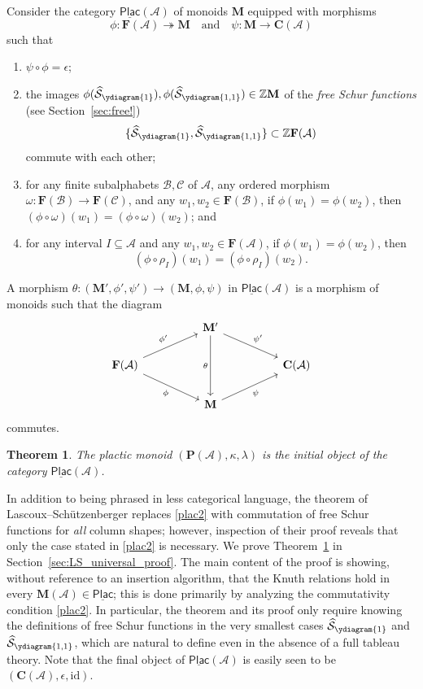 \documentclass[12 pt]{amsart}
\newcommand{\Z}{\mathbb{Z}}
\newcommand{\Plactic}{{\mathbf{P}}}
\newcommand{\Free}{\mathbf{F}}
\newcommand{\Monoid}{\mathbf{M}}
\newcommand{\Abelian}{\mathbf{C}}
\newcommand{\LSCategory}{\underline{\mathsf{Plac}}}
\newcommand{\FreeSchur}{\widehat{\mathcal{S}}}
\newcommand{\cA}{\mathcal{A}}
\newcommand{\cB}{\mathcal{B}}
\newcommand{\cC}{\mathcal{C}}
\newcommand{\id}{\mathrm{id}}
\newtheorem{theorem}[thm]{Theorem}
\theoremstyle{remark}
\numberwithin{equation}{section}
\begin{document}
Consider the category $\LSCategory(\cA)$ of monoids $\Monoid$ equipped with morphisms
\[\phi : \Free(\cA) \twoheadrightarrow \Monoid \quad \text{and} \quad \psi : \Monoid \to \Abelian(\cA)
\]such that 
\begin{enumerate}[label=\textrm{(Plac.\arabic*)}]
    \item $\psi \circ \phi = \epsilon$; \label{plac1}
    \item {} the images $\phi(\FreeSchur_{\ydiagram{1}}), \phi(\FreeSchur_{\ydiagram{1,1}}) \in \Z\Monoid$ of the \emph{free Schur functions} (see Section~\ref{sec:free!}) \[
    \{ \FreeSchur_{\ydiagram{1}}, \FreeSchur_{\ydiagram{1,1}} \} \subset \Z\Free(\cA)
    \]
    commute with each other; \label{plac2}
    \item for any finite subalphabets $\cB, \cC$ of $\cA$, any ordered morphism $\omega : \Free(\cB) \to \Free(\cC)$, and any $w_1, w_2 \in \Free(\cB)$, if $\phi(w_1) = \phi(w_2)$, then $(\phi \circ \omega)(w_1) = (\phi \circ \omega)(w_2)$; and \label{plac3}
    \item for any interval $I \subseteq \cA$ and any $w_1, w_2 \in \Free(\cA)$, if $\phi(w_1) = \phi(w_2)$, then \[(\phi \circ \rho_I)(w_1) = (\phi \circ \rho_I)(w_2).\] \label{plac4}
\end{enumerate}
A morphism $\theta : (\Monoid', \phi', \psi') \to (\Monoid, \phi, \psi)$ in $\LSCategory(\cA)$ is a morphism of monoids such that the diagram
\begin{equation}
\label{eq:LS_rhombus}
\begin{tikzcd}[column sep=huge]
& \Monoid' \ar[dr, "\psi'"] \ar[dd,"\theta"'] 
& \\
\Free(\cA) \ar[ur, "\phi'"] \ar[dr, "\phi"']
&
& \Abelian(\cA) \\
& \Monoid \ar[ur, "\psi"']
&
\end{tikzcd}
\end{equation}
commutes.

\begin{theorem}\label{thm:LS}
The plactic monoid $(\Plactic(\cA), \kappa, \lambda)$ is the initial object of the category $\LSCategory(\cA)$.
\end{theorem}

In addition to being phrased in less categorical language, the theorem of Lascoux--Sch\"utzenberger \cite[Th\'eor\`eme~2.16]{Lascoux.Schutzenberger:plaxique} replaces \ref{plac2} with commutation of free Schur functions for \emph{all} column shapes; however, inspection of their proof reveals that only the case stated in \ref{plac2} is necessary.
We prove Theorem~\ref{thm:LS} in Section~\ref{sec:LS_universal_proof}. The main content of the proof is showing, without reference to an insertion algorithm, that the Knuth relations hold in every $\Monoid(\cA) \in \LSCategory$; this is done primarily by analyzing the commutativity condition \ref{plac2}. In particular, the theorem and its proof only require knowing the definitions of free Schur functions in the very smallest cases $\FreeSchur_{\ydiagram{1}}$ and $\FreeSchur_{\ydiagram{1,1}}$, which are natural to define even in the absence of a full tableau theory.
Note that the final object of $\LSCategory(\cA)$ is easily seen to be $(\Abelian(\cA),\epsilon, \id)$.
\end{document}
